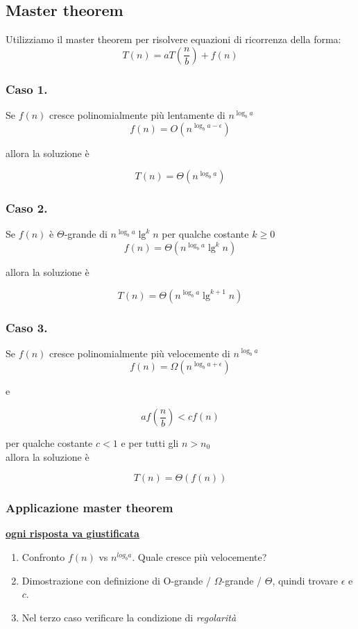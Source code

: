 \documentclass{article}
\begin{document}
\subsection{Master theorem}
Utilizziamo il master theorem per risolvere equazioni di ricorrenza della forma:
\[T(n) = aT\left(\frac{n}{b}\right) + f(n)\]
\subsubsection*{Caso 1.}
Se \(f(n)\) cresce polinomialmente più lentamente di \(n^{\log_b a}\)
\[f(n) = O\left(n^{\log_b a - \epsilon}\right)\]
\begin{center}allora la soluzione è\end{center}
\[T(n) = \Theta\left(n^{\log_b a}\right)\]
\subsubsection*{Caso 2.}
Se \(f(n)\) è \(\Theta\)-grande di \(n^{\log_b a}\lg^k n\) per qualche costante \(k \geq 0\)
\[f(n) = \Theta\left(n^{\log_b a}\lg^k n\right)\]
\begin{center}allora la soluzione è\end{center}
\[T(n) = \Theta\left(n^{\log_b a} \lg^{k+1} n\right)\]
\subsubsection*{Caso 3.}
Se \(f(n)\) cresce polinomialmente più velocemente di \(n^{\log_b a}\)
\[f(n) = \Omega\left(n^{\log_b a + \epsilon}\right)\]
\begin{center}e\end{center}
\[a f(\frac{n}{b}) < c f(n)\]
\begin{center}
  per qualche costante \(c < 1\) e per tutti gli \(n > n_0\) \\
  allora la soluzione è
\end{center}
\[T(n) = \Theta\left(f(n)\right)\]
\subsubsection*{Applicazione master theorem}
\underline{\textbf{ogni risposta va giustificata}}
\begin{enumerate}
  \item Confronto  \(f(n)\) vs \(n^{log_b a}\). Quale cresce più velocemente?
  \item Dimostrazione con definizione di O-grande / \(\Omega\)-grande / \(\Theta\), quindi trovare \(\epsilon\) e \(c\).
  \item Nel terzo caso verificare la condizione di \emph{regolarità}
\end{enumerate}
\pagebreak
\end{document}
